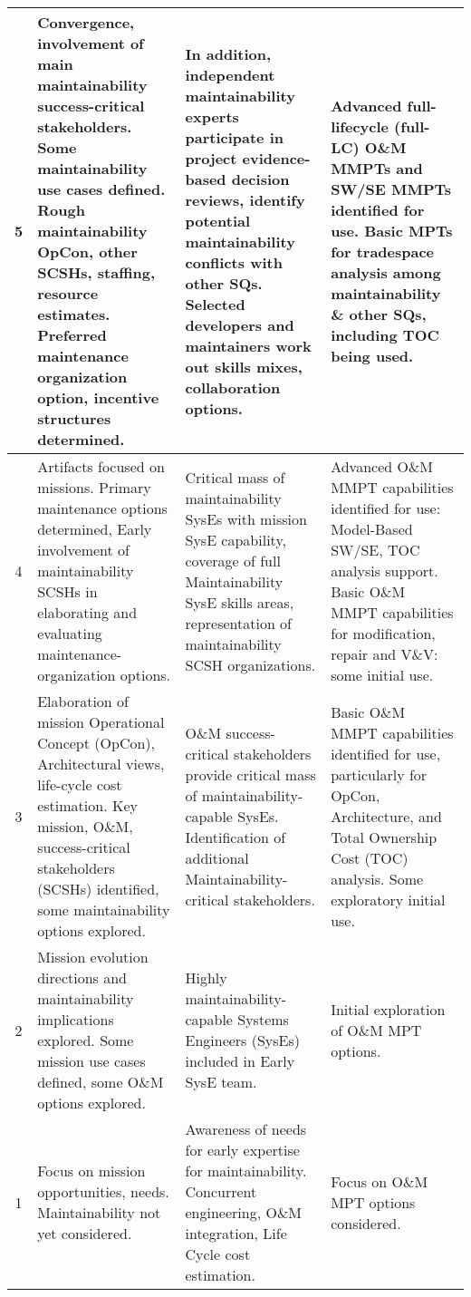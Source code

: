 \begin{table*}[htbp]
{\begin{tabular}{|c|p{18em}|p{18em}|p{16.5em}|}
			\midrule
			5     & Convergence, involvement of main maintainability success-critical stakeholders. Some maintainability use cases defined. Rough maintainability OpCon, other SCSHs, staffing, resource estimates. Preferred maintenance organization option, incentive structures determined. & In addition, independent maintainability experts participate in project evidence-based decision reviews, identify potential maintainability conflicts with other SQs. Selected developers and maintainers work out skills mixes, collaboration options. & Advanced full-lifecycle (full-LC) O\&M MMPTs and SW/SE MMPTs identified for use. Basic MPTs for tradespace analysis among maintainability \& other SQs, including TOC being used. \\
			\midrule
			4     & Artifacts focused on missions. Primary maintenance options determined, Early involvement of maintainability SCSHs in elaborating and evaluating maintenance-organization options. & Critical mass of maintainability SysEs with mission SysE capability, coverage of full Maintainability SysE skills areas, representation of maintainability SCSH organizations. & Advanced O\&M MMPT capabilities identified for use: Model-Based SW/SE, TOC analysis support. Basic O\&M MMPT capabilities for modification, repair and V\&V: some initial use. \\
			\midrule
			3     & Elaboration of mission Operational Concept (OpCon), Architectural views, life-cycle cost estimation. Key mission, O\&M, success-critical stakeholders (SCSHs) identified, some maintainability options explored. & O\&M success-critical stakeholders provide critical mass of maintainability-capable SysEs. Identification of additional Maintainability-critical stakeholders. & Basic O\&M MMPT capabilities identified for use, particularly for OpCon, Architecture, and Total Ownership Cost (TOC) analysis. Some exploratory initial use. \\
			\midrule
			2     & Mission evolution directions and maintainability implications explored. Some mission use cases defined, some O\&M options explored. & Highly maintainability-capable Systems Engineers (SysEs) included in Early SysE team. & Initial exploration of O\&M MPT options. \\
			\midrule
			1     & Focus on mission opportunities, needs. Maintainability not yet considered. & Awareness of needs for early expertise for maintainability. Concurrent engineering, O\&M integration, Life Cycle cost estimation. & Focus on O\&M MPT options considered. \\
			\bottomrule
		\end{tabular}%
	}
	\label{tab:smrf}%
\end{table*}%

